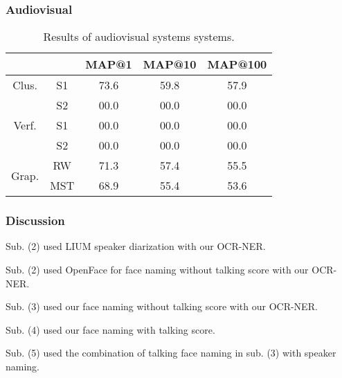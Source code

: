 \subsubsection{Audiovisual}

\begin{table}[tb]
\centering
\begin{tabular}{|c|c|c|c|c|}
\cline{3-5}
 \multicolumn{2}{c|}{ }	& MAP@1  & MAP@10 & MAP@100  \\ \hline
 \multirow{1}{*}{Clus.} & S1	& 73.6   & 59.8   & 57.9 \\ \cline{2-5}
 						& S2 	& 00.0   & 00.0   & 00.0 \\ \hline
 						
 \multirow{1}{*}{Verf.} & S1	& 00.0   & 00.0   & 00.0 \\ \cline{2-5}
 						& S2 	& 00.0   & 00.0   & 00.0 \\ \hline

 \multirow{2}{*}{Grap.} & RW 	& 71.3   &  57.4  & 55.5 \\ \cline{2-5}
 						& MST 	& 68.9   &  55.4 & 53.6 \\ \hline 								
\end{tabular}
\vspace*{-2mm}
\caption{Results of audiovisual systems systems.}
\vspace*{-2mm}
\label{tab:av_result}
\end{table}

\subsubsection{Discussion}

\begin{compactitem}
  \item Sub. (2) used LIUM speaker diarization with our OCR-NER.
  \item Sub. (2) used OpenFace for face naming without talking score with our OCR-NER.
	\item Sub. (3) used our face naming without talking score with our OCR-NER.
	\item Sub. (4) used our face naming with talking score. 
	\item Sub. (5) used the combination of talking face naming in sub. (3) with speaker naming.
\end{compactitem}

